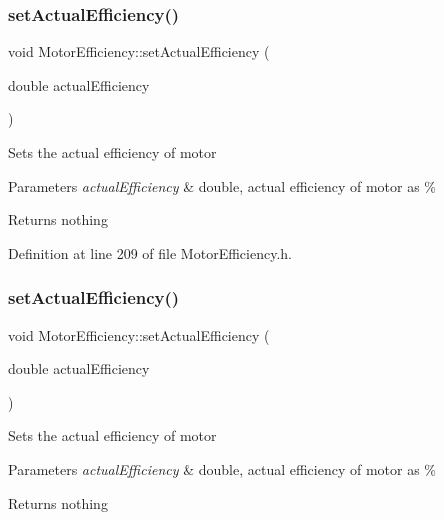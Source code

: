 \subsubsection{\texorpdfstring{set\+Actual\+Efficiency()}{setActualEfficiency()}\hspace{0.1cm}{\footnotesize\ttfamily [1/3]}}
{\footnotesize\ttfamily void Motor\+Efficiency\+::set\+Actual\+Efficiency (\begin{DoxyParamCaption}\item[{double}]{actual\+Efficiency }\end{DoxyParamCaption})\hspace{0.3cm}{\ttfamily [inline]}}

Sets the actual efficiency of motor


\begin{DoxyParams}{Parameters}
{\em actual\+Efficiency} & double, actual efficiency of motor as \%\\
\hline
\end{DoxyParams}
\begin{DoxyReturn}{Returns}
nothing 
\end{DoxyReturn}


Definition at line 209 of file Motor\+Efficiency.\+h.

\mbox{\label{class_motor_efficiency_a7a5ad8d01fdc0a3bf93d952752487496}} 
\subsubsection{\texorpdfstring{set\+Actual\+Efficiency()}{setActualEfficiency()}\hspace{0.1cm}{\footnotesize\ttfamily [2/3]}}
{\footnotesize\ttfamily void Motor\+Efficiency\+::set\+Actual\+Efficiency (\begin{DoxyParamCaption}\item[{double}]{actual\+Efficiency }\end{DoxyParamCaption})\hspace{0.3cm}{\ttfamily [inline]}}

Sets the actual efficiency of motor


\begin{DoxyParams}{Parameters}
{\em actual\+Efficiency} & double, actual efficiency of motor as \%\\
\hline
\end{DoxyParams}
\begin{DoxyReturn}{Returns}
nothing 
\end{DoxyReturn}


